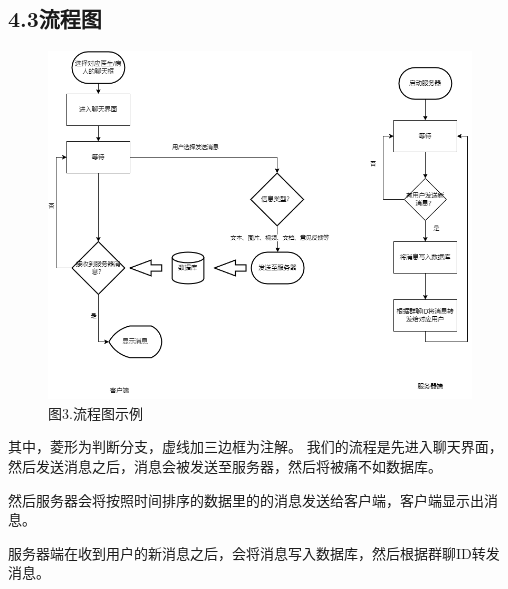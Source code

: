 \documentclass[24pt,a4paper]{article}%
\begin{document}
\subsection*{\songti 4.3流程图}
\begin{figure}[H]
    \centering
    \includegraphics[width=1\textwidth]{images/pipeline.png}
    \caption*{图3.流程图示例}
\end{figure}
其中，菱形为判断分支，虚线加三边框为注解。
我们的流程是先进入聊天界面，然后发送消息之后，消息会被发送至服务器，然后将被痛不如数据库。\par
然后服务器会将按照时间排序的数据里的的消息发送给客户端，客户端显示出消息。\par
服务器端在收到用户的新消息之后，会将消息写入数据库，然后根据群聊ID转发消息。\par
\end{document}
